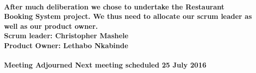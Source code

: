 \documentclass{article}
\begin{document}
\paragraph{After much deliberation we chose to undertake the Restaurant Booking System project. We thus need to allocate our scrum leader as well as our product owner. \\Scrum leader: Christopher Mashele\\Product Owner: Lethabo Nkabinde\\\\Meeting Adjourned Next meeting scheduled 25 July 2016 }
\end{document}
